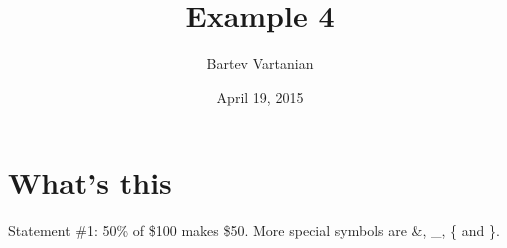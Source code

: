 \documentclass[a4paper, 11pt]{article}
\begin{document}
\title{Example 4}
\author{Bartev Vartanian}
\date{April 19, 2015}

\maketitle
\section{What's this}
Statement \#1:
50\% of \$100 makes \$50.
More special symbols are \&, \_, \{ and \}.
\end{document}
